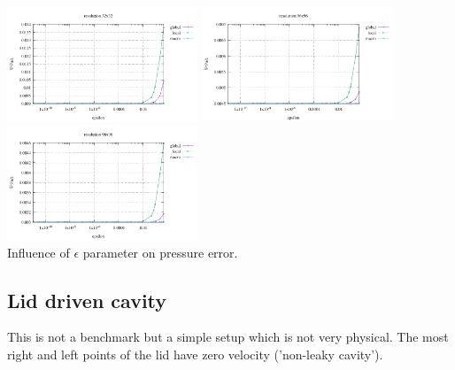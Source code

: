 \begin{center}
\includegraphics[width=5.7cm]{python_codes/fieldstone_115/results/aquarium/errorsP_32_eps}
\includegraphics[width=5.7cm]{python_codes/fieldstone_115/results/aquarium/errorsP_64_eps}
\includegraphics[width=5.7cm]{python_codes/fieldstone_115/results/aquarium/errorsP_96_eps}\\
{\captionfont Influence of $\epsilon$ parameter on pressure error.}
\end{center}


\newpage
\subsection*{Lid driven cavity}

This is not a benchmark but a simple setup which is not very physical. The most right and left
points of the lid have zero velocity ('non-leaky cavity').

